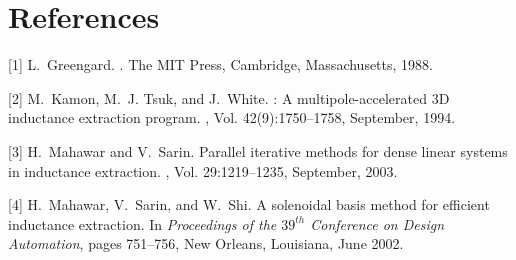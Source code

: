 \documentclass{report}
\begin{document}
\section*{References}
[1] L.~Greengard.
.
\newblock The MIT Press, Cambridge, Massachusetts, 1988.

\parindent=0pt
[2] M.~Kamon, M.~J. Tsuk, and J.~White.
: A multipole-accelerated 3{D} inductance extraction program.
, Vol.
42(9):1750--1758, September, 1994.

[3] H.~Mahawar and V.~Sarin.
\newblock Parallel iterative methods for dense linear systems in inductance extraction.
, Vol. 29:1219--1235, September, 2003.

[4] H.~Mahawar, V.~Sarin, and W.~Shi.
\newblock A solenoidal basis method for efficient inductance extraction.
\newblock In {\em Proceedings of the $39^{th}$ Conference on Design
Automation}, pages 751--756, New Orleans, Louisiana, June 2002.
\end{document}
